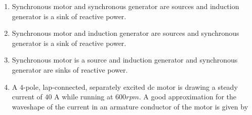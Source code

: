 \documentclass[journal]{IEEEtran}
\begin{document}
\begin{enumerate}
	\begin{enumerate}
	\item Synchronous motor and synchronous generator are sources and induction generator is a sink of reactive power.
\item Synchronous motor and induction generator are sources and synchronous generator is a sink of reactive power.
	\item Synchronous motor is a source and induction generator and synchronous generator are sinks of reactive power.
\item A $4$-pole, lap-connected, separately excited dc motor is drawing a steady current of $40$ A while running at $600 rpm$. A good approximation for the waveshape of the current in an armature conductor of the motor is given by
\end{enumerate}


\end{enumerate}
\end{document}
